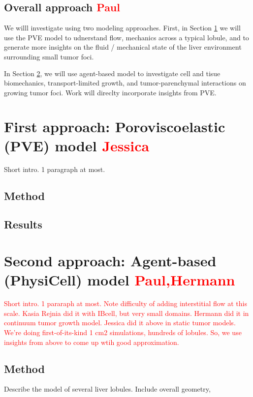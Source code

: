 \documentclass[smallextended,natbib]{svjour3}
\newcommand{\red}[1]{\textcolor{red}{#1}}
\begin{document}

\subsection{Overall approach \red{Paul}}
We willl investigate using two modeling approaches. First, in Section 
\ref{section:PVE} we will use the PVE model to udnerstand flow, 
mechanics across a typical lobule, and to generate more insights on 
the fluid / mechanical state of the liver environment surrounding 
small tumor foci. 

In Section \ref{section:ABM}, we will use agent-based model 
to investigate cell and tisue biomechanics, transport-limited 
growth, and tumor-parenchymal interactions on growing tumor foci. 
Work will direclty incorporate insights from PVE. 


\section{First approach: Poroviscoelastic (PVE) model \red{Jessica}}
\label{section:PVE}
Short intro. 1 paragraph at most. 

\subsection{Method}
\subsection{Results}

\vfill
\pagebreak

\section{Second approach: Agent-based (PhysiCell) model \red{Paul,Hermann}}
\label{section:ABM}
\red{Short intro. 1 pararaph at most.  Note difficulty of adding interstitial flow at this scale. 
Kasia Rejnia did it with IBcell, but very small domains. Hermann did it in continuum tumor growth 
model. Jessica did it above in static tumor models. We're doing first-of-its-kind 1 cm2 
simulations, hundreds of lobules. So, we use insights from above to come up wtih good approximation. }

\subsection{Method} 
Describe the model of several liver lobules.  Include overall geometry, 
\end{document}
